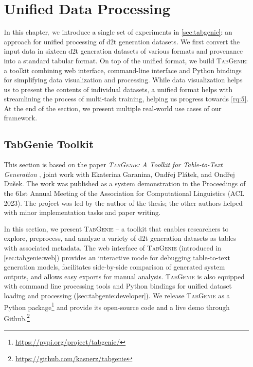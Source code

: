 
\chapter{Unified Data Processing}
\label{chap:tabgenie}

In this chapter, we introduce a single set of experiments in \autoref{sec:tabgenie}: an approach for unified processing of \ac{d2t} generation datasets. We first convert the input data in sixteen \ac{d2t} generation datasets of various formats and provenance into a standard tabular format. On top of the unified format, we build \textsc{TabGenie}: a toolkit combining web interface, command-line interface and Python bindings for simplifying data visualization and processing. While data visualization helps us to present the contents of individual datasets, a unified format helps with streamlining the process of multi-task training, helping us progress towards \ref{rq:5}. At the end of the section, we present multiple real-world use cases of our framework.


\section{TabGenie Toolkit}
\label{sec:tabgenie}

\begin{refbox}
    This section is based on the paper \emph{\textsc{TabGenie}: A Toolkit for Table-to-Text Generation} \cite{kasnerTabGenieToolkitTabletoText2023}, joint work with Ekaterina Garanina, Ondřej Plátek, and Ondřej Dušek. The work was published as a system demonstration in the Proceedings of the 61st Annual Meeting of the Association for Computational Linguistics (ACL 2023). The project was led by the author of the thesis; the other authors helped with minor implementation tasks and paper writing.
\end{refbox}


In this section, we present \textsc{TabGenie} -- a toolkit that enables researchers to explore, preprocess, and analyze a variety of \ac{d2t} generation datasets as tables with associated metadata. The web interface of \textsc{TabGenie} (introduced in \autoref{sec:tabgenie:web}) provides an interactive mode for debugging table-to-text generation models, facilitates side-by-side comparison of generated system outputs, and allows easy exports for manual analysis. \textsc{TabGenie} is also equipped with command line processing tools and Python bindings for unified dataset loading and processing (\autoref{sec:tabgenie:developer}). We release \textsc{TabGenie} as a Python package\footnote{\url{https://pypi.org/project/tabgenie/}} and provide its open-source code and a live demo through Github.\footnote{\url{https://github.com/kasnerz/tabgenie}}

